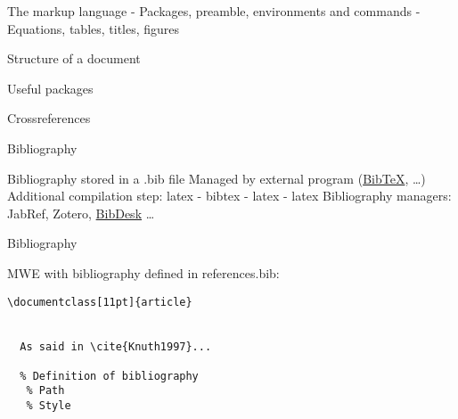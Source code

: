 \begin{frame}{The markup language}
- Packages, preamble, environments and commands
- Equations, tables, titles, figures 
\end{frame}

\begin{frame}{Structure of a document}

\end{frame}

\begin{frame}{Useful packages}

\end{frame}

\begin{frame}{Crossreferences}

\end{frame}

\begin{frame}{Bibliography}
 \begin{fullpageitemize}
  \itemR Bibliography stored in a {\inconsolatafont .bib} file 
  \itemR Managed by external program (\href{http://www.bibtex.org/}{BibTeX}, \ldots) 
  \itemR Additional compilation step: {\inconsolatafont latex - bibtex - latex - latex}
  \itemR Bibliography managers: JabRef, Zotero, \href{https://bibdesk.sourceforge.io/}{BibDesk} \ldots
 \end{fullpageitemize}
 
\end{frame}

\begin{frame}[fragile]{Bibliography}

MWE with bibliography defined in {\inconsolatafont references.bib}:

\begin{lstlisting}[language={[LaTeX]TeX},texcsstyle=*\color{colororange}]
\documentclass[11pt]{article}
  
  
  As said in \cite{Knuth1997}...
    
  % Definition of bibliography
   % Path
   % Style

\end{lstlisting}


\end{frame}

